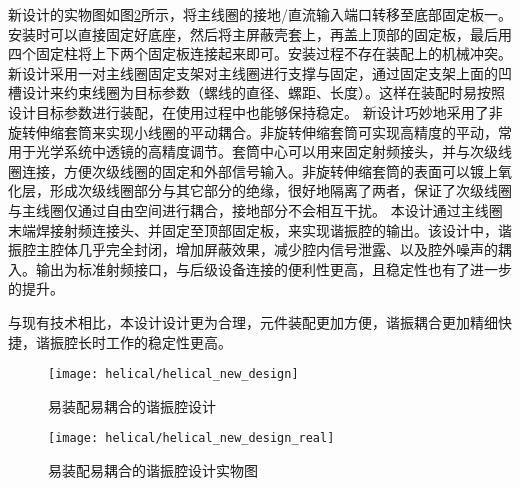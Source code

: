 新设计的实物图如图\ref{fig:helical_new_design_real}所示，将主线圈的接地/直流输入端口转移至底部固定板一。安装时可以直接固定好底座，然后将主屏蔽壳套上，再盖上顶部的固定板，最后用四个固定柱将上下两个固定板连接起来即可。安装过程不存在装配上的机械冲突。
新设计采用一对主线圈固定支架对主线圈进行支撑与固定，通过固定支架上面的凹槽设计来约束线圈为目标参数（螺线的直径、螺距、长度）。这样在装配时易按照设计目标参数进行装配，在使用过程中也能够保持稳定。
新设计巧妙地采用了非旋转伸缩套筒来实现小线圈的平动耦合。非旋转伸缩套筒可实现高精度的平动，常用于光学系统中透镜的高精度调节。套筒中心可以用来固定射频接头，并与次级线圈连接，方便次级线圈的固定和外部信号输入。非旋转伸缩套筒的表面可以镀上氧化层，形成次级线圈部分与其它部分的绝缘，很好地隔离了两者，保证了次级线圈与主线圈仅通过自由空间进行耦合，接地部分不会相互干扰。
本设计通过主线圈末端焊接射频连接头、并固定至顶部固定板，来实现谐振腔的输出。该设计中，谐振腔主腔体几乎完全封闭，增加屏蔽效果，减少腔内信号泄露、以及腔外噪声的耦入。输出为标准射频接口，与后级设备连接的便利性更高，且稳定性也有了进一步的提升。

与现有技术相比，本设计设计更为合理，元件装配更加方便，谐振耦合更加精细快捷，谐振腔长时工作的稳定性更高。
\begin{figure}
    \centering
    \caption[易装配易耦合的谐振腔设计]{易装配易耦合的谐振腔设计\label{fig:helical_new_design}}
    \texttt{[image: helical/helical\_new\_design]}
\end{figure}

\begin{figure}
    \centering
    \caption[易装配易耦合的谐振腔设计实物图]{易装配易耦合的谐振腔设计实物图\label{fig:helical_new_design_real}}
    \texttt{[image: helical/helical\_new\_design\_real]}
\end{figure}